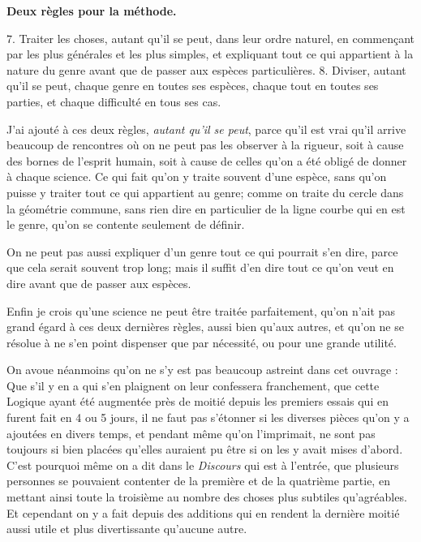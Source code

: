 \begin{center}\textbf{Deux règles pour la méthode.}\end{center}

$7$. Traiter les choses, autant qu'il se peut, dans leur ordre naturel, en commençant par les plus générales et les plus simples, et expliquant tout ce qui appartient à la nature du genre avant que de passer aux espèces particulières.
\smallbreak
$8$. Diviser, autant qu'il se peut, chaque genre en toutes ses espèces, chaque tout en toutes ses parties, et chaque difficulté en tous ses cas.

J'ai ajouté à ces deux règles, \emph{autant qu'il se peut}, parce qu'il est vrai qu'il arrive beaucoup de rencontres où on ne peut pas les observer à la rigueur, soit à cause des bornes de l'esprit humain, soit à cause de celles qu'on a été obligé de donner à chaque science. Ce qui fait qu'on y traite souvent d'une espèce, sans qu'on puisse y traiter tout ce qui appartient au genre; comme on traite du cercle dans la géométrie commune, sans rien dire en particulier de la ligne courbe qui en est le genre, qu'on se contente seulement de définir.

On ne peut pas aussi expliquer d'un genre tout ce qui pourrait s'en dire, parce que cela serait souvent trop long; mais il suffit d'en dire tout ce qu'on veut en dire avant que de passer aux espèces.

Enfin je crois qu'une science ne peut être traitée parfaitement, qu'on n'ait pas grand égard à ces deux dernières règles, aussi bien qu'aux autres, et qu'on ne se résolue à ne s'en point dispenser que par nécessité, ou pour une grande utilité.

On avoue néanmoins qu'on ne s'y est pas beaucoup astreint dans cet ouvrage : Que s'il y en a qui s'en plaignent on leur confessera franchement, que cette Logique ayant été augmentée près de moitié depuis les premiers essais qui en furent fait en 4 ou 5 jours, il ne faut pas s'étonner si les diverses pièces qu'on y a ajoutées en divers temps, et pendant même qu'on l'imprimait, ne sont pas toujours si bien placées qu'elles auraient pu être si on les y avait mises d'abord. C'est pourquoi même on a dit dans le \emph{Discours} qui est à l'entrée, que plusieurs personnes se pouvaient contenter de la première et de la quatrième partie, en mettant ainsi toute la troisième au nombre des choses plus subtiles qu'agréables. Et cependant on y a fait depuis des additions qui en rendent la dernière moitié aussi utile et plus divertissante qu'aucune autre.


